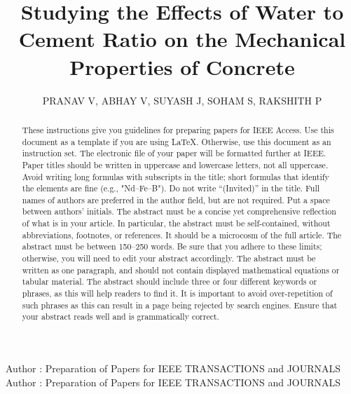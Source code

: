 \documentclass{ieeeaccess}
\begin{document}

\title{Studying the Effects of Water to Cement Ratio on the Mechanical Properties of 
       Concrete}
\author{
    \uppercase{Pranav V}, \uppercase{Abhay V}, 
    \uppercase{Suyash J}, \uppercase{Soham S},
    \uppercase{Rakshith P}
}

\address[1]{Department of Electronics and Communication Engineering,
            RV College of Engineering, Bangalore, India}
\address[1]{Department of Mechanical Engineering,
            RV College of Engineering, Bangalore, India}
\address[1]{Department of Information Science and Engineering,
            RV College of Engineering, Bangalore, India}

\markboth
{Author \headeretal: Preparation of Papers for IEEE TRANSACTIONS and JOURNALS}
{Author \headeretal: Preparation of Papers for IEEE TRANSACTIONS and JOURNALS}



\begin{abstract}
These instructions give you guidelines for preparing papers for
IEEE Access. Use this document as a template if you are
using \LaTeX. Otherwise, use this document as an
instruction set. The electronic file of your paper will be formatted further
at IEEE. Paper titles should be written in uppercase and lowercase letters,
not all uppercase. Avoid writing long formulas with subscripts in the title;
short formulas that identify the elements are fine (e.g., "Nd--Fe--B"). Do
not write ``(Invited)'' in the title. Full names of authors are preferred in
the author field, but are not required. Put a space between authors'
initials. The abstract must be a concise yet comprehensive reflection of
what is in your article. In particular, the abstract must be self-contained,
without abbreviations, footnotes, or references. It should be a microcosm of
the full article. The abstract must be between 150--250 words. Be sure that
you adhere to these limits; otherwise, you will need to edit your abstract
accordingly. The abstract must be written as one paragraph, and should not
contain displayed mathematical equations or tabular material. The abstract
should include three or four different keywords or phrases, as this will
help readers to find it. It is important to avoid over-repetition of such
phrases as this can result in a page being rejected by search engines.
Ensure that your abstract reads well and is grammatically correct.
\end{abstract}
\end{document}
